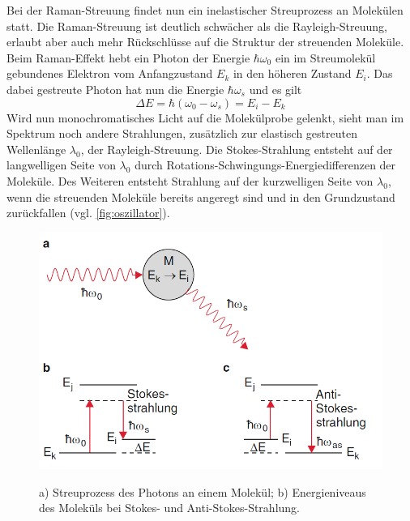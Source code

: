 \documentclass[.../bericht]{subfilies}
\begin{document}
      Bei der Raman-Streuung findet nun ein inelastischer Streuprozess an Molekülen statt. Die Raman-Streuung ist deutlich schwächer als die Rayleigh-Streuung, erlaubt aber auch mehr Rückschlüsse auf die Struktur der streuenden Moleküle. Beim Raman-Effekt hebt ein Photon der Energie $\hbar \omega_0$ ein im Streumolekül gebundenes Elektron vom Anfangzustand $E_k$ in den höheren Zustand $E_i$. Das dabei gestreute Photon hat nun die Energie $\hbar \omega_s$ und es gilt
      \begin{equation*}
        \Delta E= \hbar (\omega_0-\omega_s)=E_i-E_k
      \end{equation*}
      Wird nun monochromatisches Licht auf die Molekülprobe gelenkt, sieht man im Spektrum noch andere Strahlungen, zusätzlich zur elastisch gestreuten Wellenlänge $\lambda_0$, der Rayleigh-Streuung. Die Stokes-Strahlung entsteht auf der langwelligen Seite von $\lambda_0$  durch Rotations-Schwingungs-Energiedifferenzen der Moleküle. Des Weiteren entsteht Strahlung auf der kurzwelligen Seite von $\lambda_0$, wenn die streuenden Moleküle bereits angeregt sind und in den Grundzustand zurückfallen (vgl. \cref{fig:oszillator}).

      \begin{figure}[tb]
        \begin{center}
          \fbox
          {
            \includegraphics[scale=0.5]{figures/rayleighphoton}
            }
            \caption{a) Streuprozess des Photons an einem Molekül; b) Energieniveaus des Moleküls bei Stokes- und Anti-Stokes-Strahlung. \cite{dem:exp3}
          }
          \label{fig:anti-stokes}
        \end{center}
      \end{figure}
\end{document}
